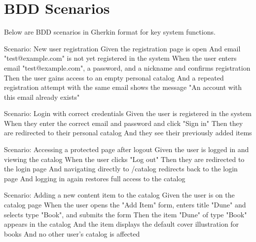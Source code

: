 \section{BDD Scenarios}
\label{sec:bdd}

Below are BDD scenarios in Gherkin format for key system functions.

\begin{codelisting}
\caption{New User Registration}
\label{lst:bdd}
\begin{skedcode}
Scenario: New user registration
  Given the registration page is open
  And email "test@example.com" is not yet registered in the system
  When the user enters email "test@example.com", a password, and a nickname
    and confirms registration
  Then the user gains access to an empty personal catalog
  And a repeated registration attempt with the same email shows the message
    "An account with this email already exists"
\end{skedcode}
\end{codelisting}

\begin{codelisting}
\caption{Account Login}
\label{lst:bdd-login}
\begin{skedcode}
Scenario: Login with correct credentials
  Given the user is registered in the system
  When they enter the correct email and password and click "Sign in"
  Then they are redirected to their personal catalog
  And they see their previously added items
\end{skedcode}
\end{codelisting}

\begin{codelisting}
\caption{Logout and Protected Page Access}
\label{lst:bdd-logout}
\begin{skedcode}
Scenario: Accessing a protected page after logout
  Given the user is logged in and viewing the catalog
  When the user clicks "Log out"
  Then they are redirected to the login page
  And navigating directly to /catalog redirects back to the login page
  And logging in again restores full access to the catalog
\end{skedcode}
\end{codelisting}

\begin{codelisting}
\caption{Adding a New Item}
\label{lst:bdd-add}
\begin{skedcode}
Scenario: Adding a new content item to the catalog
  Given the user is on the catalog page
  When the user opens the "Add Item" form,
    enters title "Dune" and selects type "Book",
    and submits the form
  Then the item "Dune" of type "Book" appears in the catalog
  And the item displays the default cover illustration for books
  And no other user's catalog is affected
\end{skedcode}
\end{codelisting}

